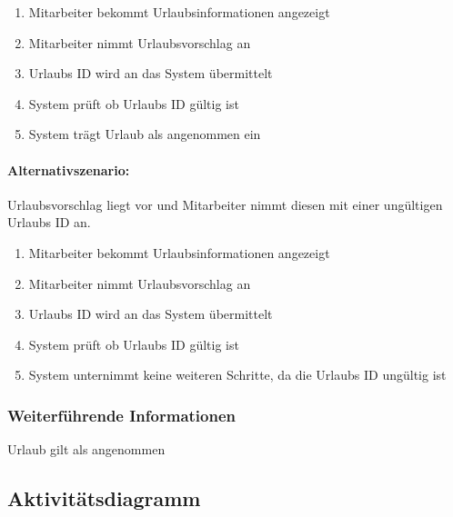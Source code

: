 \begin{enumerate}
	\item Mitarbeiter bekommt Urlaubsinformationen angezeigt
	\item Mitarbeiter nimmt Urlaubsvorschlag an
	\item Urlaubs ID wird an das System übermittelt
	\item System prüft ob Urlaubs ID gültig ist
	\item System trägt Urlaub als angenommen ein
\end{enumerate}



\paragraph{Alternativszenario:}
Urlaubsvorschlag liegt vor und Mitarbeiter nimmt diesen mit einer ungültigen Urlaubs ID an.

\begin{enumerate}
	\item Mitarbeiter bekommt Urlaubsinformationen angezeigt
	\item Mitarbeiter nimmt Urlaubsvorschlag an
	\item Urlaubs ID wird an das System übermittelt
	\item System prüft ob Urlaubs ID gültig ist
	\item System unternimmt keine weiteren Schritte, da die Urlaubs ID ungültig ist
\end{enumerate}


\subsubsection{Weiterführende Informationen}
Urlaub gilt als angenommen

\subsection{Aktivitätsdiagramm}

